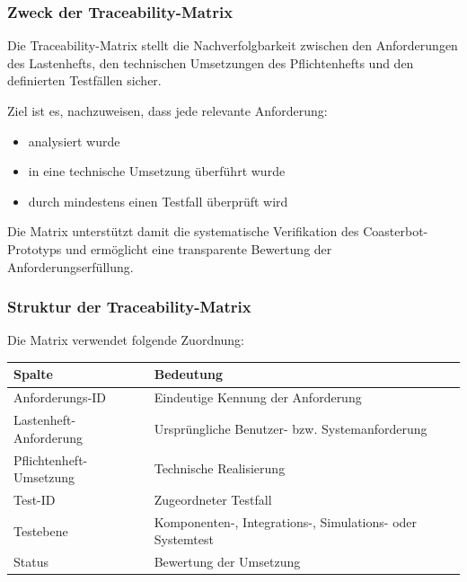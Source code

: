 \documentclass[
  a4paper,
  12pt,
  DIV=12,        %
  parskip=half,  %
  headings=small %
]{scrartcl}
\theoremstyle{definition}
\providecommand{\tightlist}{%
  \setlength{\itemsep}{0pt}\setlength{\parskip}{0pt}}
\theoremstyle{definition}
\begin{document}
\subsubsection{Zweck der
Traceability-Matrix}\label{zweck-der-traceability-matrix}

Die Traceability-Matrix stellt die Nachverfolgbarkeit zwischen den
Anforderungen des Lastenhefts, den technischen Umsetzungen des
Pflichtenhefts und den definierten Testfällen sicher.

Ziel ist es, nachzuweisen, dass jede relevante Anforderung:

\begin{itemize}
\tightlist
\item
  analysiert wurde
\item
  in eine technische Umsetzung überführt wurde
\item
  durch mindestens einen Testfall überprüft wird
\end{itemize}

Die Matrix unterstützt damit die systematische Verifikation des
Coasterbot-Prototyps und ermöglicht eine transparente Bewertung der
Anforderungserfüllung.

\subsubsection{Struktur der
Traceability-Matrix}\label{struktur-der-traceability-matrix}

Die Matrix verwendet folgende Zuordnung:

\begin{longtable}[]{@{}
  >{\raggedright\arraybackslash}p{}
  >{\raggedright\arraybackslash}p{}@{}}
\toprule\noalign{}
\begin{minipage}[b]{\linewidth}\raggedright
Spalte
\end{minipage} & \begin{minipage}[b]{\linewidth}\raggedright
Bedeutung
\end{minipage} \\
\midrule\noalign{}
\endhead
\bottomrule\noalign{}
\endlastfoot
Anforderungs-ID & Eindeutige Kennung der Anforderung \\
Lastenheft-Anforderung & Ursprüngliche Benutzer- bzw.
Systemanforderung \\
Pflichtenheft-Umsetzung & Technische Realisierung \\
Test-ID & Zugeordneter Testfall \\
Testebene & Komponenten-, Integrations-, Simulations- oder Systemtest \\
Status & Bewertung der Umsetzung \\
\end{longtable}
\end{document}
